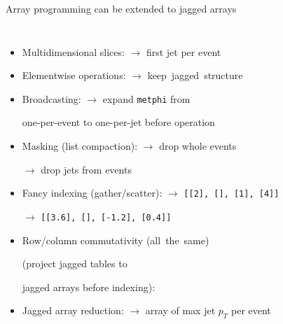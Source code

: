 \documentclass[aspectratio=169]{beamer}
\begin{document}
\begin{frame}{Array programming can be extended to jagged arrays}
\vspace{0.1 cm}
\begin{columns}
\begin{itemize}\setlength{\itemsep}{0.15 cm}
\item Multidimensional slices:  $\to$ first jet per event
\item<2-> Elementwise operations:  $\to$ \mbox{keep jagged structure\hspace{-1 cm}}
\item<3-> Broadcasting:  $\to$ expand {\small \texttt{metphi}} from

\tabto{5.5 cm}one-per-event to one-per-jet before operation

\item<4-> Masking (list compaction):  $\to$ drop whole events

 $\to$ drop jets from events

\item<5-> Fancy indexing (gather/scatter):  $\to$ \mbox{\small \texttt{[[2], [], [1], [4]]}\hspace{-0.5 cm}}

 $\to$ \mbox{\small \texttt{[[3.6], [], [-1.2], [0.4]]}\hspace{-0.5 cm}}

\item<6-> Row/column commutativity  \mbox{(all the same)\hspace{-0.5 cm}}

(project jagged tables to 

jagged arrays before indexing): 



\item<7-> Jagged array reduction:  $\to$ array of max jet $p_T$ per event
\end{itemize}
\end{columns}
\end{frame}
\end{document}

